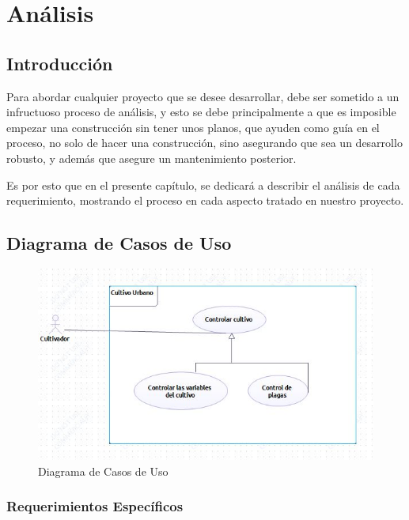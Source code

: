 \chapter{Análisis}

\section{Introducción}

Para abordar cualquier proyecto que se desee desarrollar, debe ser sometido a un infructuoso proceso de análisis, y esto se debe principalmente a que es imposible empezar una construcción sin tener unos planos, que ayuden como guía en el proceso, no solo de hacer una construcción, sino asegurando que sea un desarrollo robusto, y además que asegure un mantenimiento posterior.

Es por esto que en el presente capítulo, se dedicará a describir el análisis de cada requerimiento, mostrando el proceso en cada aspecto tratado en nuestro proyecto.

\newpage

\section{Diagrama de Casos de Uso}

\begin{figure}[h!]
	\centering
	\includegraphics[width=0.7\linewidth]{proyecto/imgs/CasoDeUso}
	\caption{Diagrama de Casos de Uso}
	\label{fig:cronograma}
\end{figure}


\subsection{Requerimientos Específicos}

